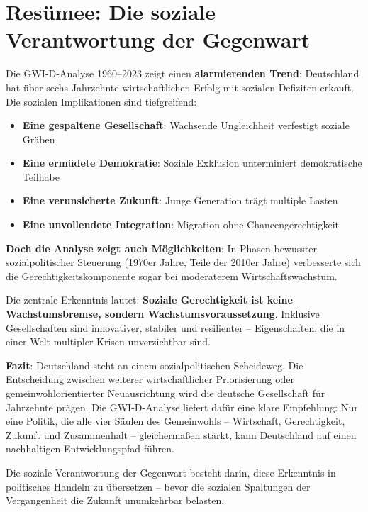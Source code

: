 \section{Resümee: Die soziale Verantwortung der Gegenwart}

Die GWI-D-Analyse 1960–2023 zeigt einen \textbf{alarmierenden Trend}: Deutschland hat über sechs Jahrzehnte wirtschaftlichen Erfolg mit sozialen Defiziten erkauft. Die sozialen Implikationen sind tiefgreifend:

\begin{itemize}
    \item \textbf{Eine gespaltene Gesellschaft}: Wachsende Ungleichheit verfestigt soziale Gräben
    \item \textbf{Eine ermüdete Demokratie}: Soziale Exklusion unterminiert demokratische Teilhabe
    \item \textbf{Eine verunsicherte Zukunft}: Junge Generation trägt multiple Lasten
    \item \textbf{Eine unvollendete Integration}: Migration ohne Chancengerechtigkeit
\end{itemize}

\textbf{Doch die Analyse zeigt auch Möglichkeiten}: In Phasen bewusster sozialpolitischer Steuerung (1970er Jahre, Teile der 2010er Jahre) verbesserte sich die Gerechtigkeitskomponente sogar bei moderaterem Wirtschaftswachstum.

Die zentrale Erkenntnis lautet: \textbf{Soziale Gerechtigkeit ist keine Wachstumsbremse, sondern Wachstumsvoraussetzung}. Inklusive Gesellschaften sind innovativer, stabiler und resilienter – Eigenschaften, die in einer Welt multipler Krisen unverzichtbar sind.

\textbf{Fazit}: Deutschland steht an einem sozialpolitischen Scheideweg. Die Entscheidung zwischen weiterer wirtschaftlicher Priorisierung oder gemeinwohlorientierter Neuausrichtung wird die deutsche Gesellschaft für Jahrzehnte prägen. Die GWI-D-Analyse liefert dafür eine klare Empfehlung: Nur eine Politik, die alle vier Säulen des Gemeinwohls – Wirtschaft, Gerechtigkeit, Zukunft und Zusammenhalt – gleichermaßen stärkt, kann Deutschland auf einen nachhaltigen Entwicklungspfad führen.

Die soziale Verantwortung der Gegenwart besteht darin, diese Erkenntnis in politisches Handeln zu übersetzen – bevor die sozialen Spaltungen der Vergangenheit die Zukunft unumkehrbar belasten.

\endinput